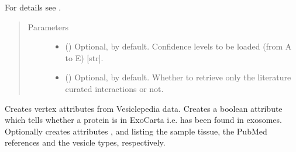 \documentclass[letterpaper,10pt,english]{sphinxmanual}
\begin{document}
\begin{fulllineitems}
\begin{fulllineitems}
For details see .
\begin{quote}\begin{description}
\item[{Parameters}] \leavevmode\begin{itemize}
\item {} 
 () \textendash{} Optional,  by default. Confidence levels to be
loaded (from A to E) {[}str{]}.

\item {} 
 () \textendash{} Optional,  by default. Whether to retrieve only the
literature curated interactions or not.

\end{itemize}

\end{description}\end{quote}

\end{fulllineitems}


\begin{fulllineitems}
\label{\detokenize{reference:pypath.main.PyPath.load_vesiclepedia_attrs}}
Creates vertex attributes from Vesiclepedia data. Creates a boolean
attribute  which tells whether a protein is
in ExoCarta i.e. has been found in exosomes. Optionally creates
attributes ,  and
 listing the sample tissue, the PubMed
references and the vesicle types, respectively.

\end{fulllineitems}



\end{fulllineitems}
\end{document}
